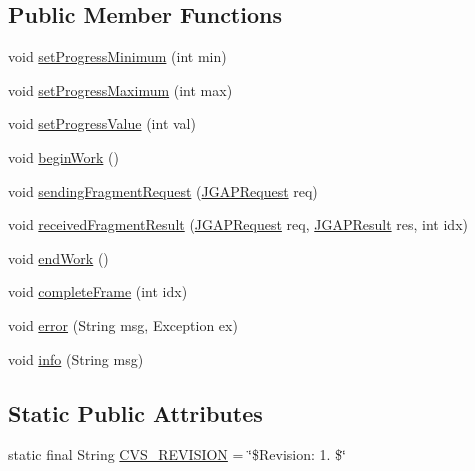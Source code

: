 \subsection*{Public Member Functions}
\begin{DoxyCompactItemize}
\item 
void \hyperlink{interfaceorg_1_1jgap_1_1distr_1_1grid_1_1_i_client_feedback_ac1382d21c3c01b6bbae6d26894d9aa7a}{set\-Progress\-Minimum} (int min)
\item 
void \hyperlink{interfaceorg_1_1jgap_1_1distr_1_1grid_1_1_i_client_feedback_a88cc0487ca9869cb2f7bc8cb49892d20}{set\-Progress\-Maximum} (int max)
\item 
void \hyperlink{interfaceorg_1_1jgap_1_1distr_1_1grid_1_1_i_client_feedback_ad55141e5c087faa28b8e6efe3d7076ca}{set\-Progress\-Value} (int val)
\item 
void \hyperlink{interfaceorg_1_1jgap_1_1distr_1_1grid_1_1_i_client_feedback_a801ba258ccaad11e3684e9f7c3e71cad}{begin\-Work} ()
\item 
void \hyperlink{interfaceorg_1_1jgap_1_1distr_1_1grid_1_1_i_client_feedback_abbf9abc916169b43804231d1681a06b5}{sending\-Fragment\-Request} (\hyperlink{classorg_1_1jgap_1_1distr_1_1grid_1_1_j_g_a_p_request}{J\-G\-A\-P\-Request} req)
\item 
void \hyperlink{interfaceorg_1_1jgap_1_1distr_1_1grid_1_1_i_client_feedback_a64e712fa6699da7425589a01556875de}{received\-Fragment\-Result} (\hyperlink{classorg_1_1jgap_1_1distr_1_1grid_1_1_j_g_a_p_request}{J\-G\-A\-P\-Request} req, \hyperlink{classorg_1_1jgap_1_1distr_1_1grid_1_1_j_g_a_p_result}{J\-G\-A\-P\-Result} res, int idx)
\item 
void \hyperlink{interfaceorg_1_1jgap_1_1distr_1_1grid_1_1_i_client_feedback_ae92d76f38737f8f5a26b19d4a82bf8d0}{end\-Work} ()
\item 
void \hyperlink{interfaceorg_1_1jgap_1_1distr_1_1grid_1_1_i_client_feedback_a7cbf8cba97b317b1cb3e15d915b2ca68}{complete\-Frame} (int idx)
\item 
void \hyperlink{interfaceorg_1_1jgap_1_1distr_1_1grid_1_1_i_client_feedback_a0526c2a20620f46b8a4a59c14c8b1ec1}{error} (String msg, Exception ex)
\item 
void \hyperlink{interfaceorg_1_1jgap_1_1distr_1_1grid_1_1_i_client_feedback_a19190ca36c4f1b32d105ef30b134051d}{info} (String msg)
\end{DoxyCompactItemize}
\subsection*{Static Public Attributes}
\begin{DoxyCompactItemize}
\item 
static final String \hyperlink{interfaceorg_1_1jgap_1_1distr_1_1grid_1_1_i_client_feedback_a6d925edd2c503da763c6738806420206}{C\-V\-S\-\_\-\-R\-E\-V\-I\-S\-I\-O\-N} = \char`\"{}\$Revision\-: 1. \$\char`\"{}
\end{DoxyCompactItemize}



